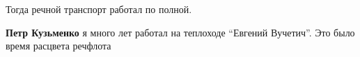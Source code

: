  
 
 
 
 

Тогда речной транспорт работал по полной.

\textbf{Петр Кузьменко} я много лет работал на теплоходе \enquote{Евгений
Вучетич}. Это было время расцвета речфлота
